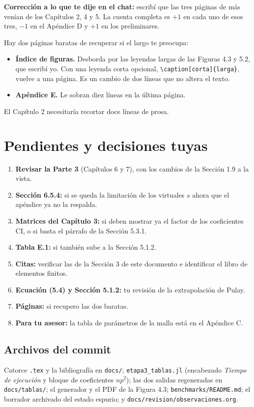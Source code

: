 \documentclass[11pt,a4paper]{article}
\newcommand{\arch}[1]{\texttt{\small #1}}
\begin{document}
\textbf{Corrección a lo que te dije en el chat:} escribí que las tres páginas de más venían de los
Capítulos 2, 4 y 5. La cuenta completa es $+1$ en cada uno de esos tres, $-1$ en el Apéndice D y
$+1$ en los preliminares.

Hay dos páginas baratas de recuperar si el largo te preocupa:
\begin{itemize}
\item \textbf{Índice de figuras.} Desborda por las leyendas largas de las Figuras 4.3 y 5.2, que
escribí yo. Con una leyenda corta opcional, \verb|\caption[corta]{larga}|, vuelve a una página.
Es un cambio de dos líneas que no altera el texto.
\item \textbf{Apéndice E.} Le sobran diez líneas en la última página.
\end{itemize}
El Capítulo 2 necesitaría recortar doce líneas de prosa.

\section{Pendientes y decisiones tuyas}

\begin{enumerate}
\item \textbf{Revisar la Parte 3} (Capítulos 6 y 7), con los cambios de la Sección 1.9 a la vista.
\item \textbf{Sección 6.5.4:} si se queda la limitación de los virtuales $s$ ahora que el
apéndice ya no la respalda.
\item \textbf{Matrices del Capítulo 3:} si deben mostrar ya el factor de los coeficientes CI, o si
basta el párrafo de la Sección 5.3.1.
\item \textbf{Tabla E.1:} si también sube a la Sección 5.1.2.
\item \textbf{Citas:} verificar las de la Sección 3 de este documento e identificar el libro de
elementos finitos.
\item \textbf{Ecuación (5.4) y Sección 5.1.2:} tu revisión de la extrapolación de Pulay.
\item \textbf{Páginas:} si recupero las dos baratas.
\item \textbf{Para tu asesor:} la tabla de parámetros de la malla está en el Apéndice C.
\end{enumerate}

\subsection*{Archivos del commit}

Catorce \arch{.tex} y la bibliografía en \arch{docs/}; \arch{etapa3\_tablas.jl} (encabezado
\emph{Tiempo de ejecución} y bloque de coeficientes $np^2$); las dos salidas regeneradas en
\arch{docs/tablas/}; el generador y el PDF de la Figura 4.3; \arch{benchmarks/README.md}; el
borrador archivado del estado espurio; y \arch{docs/revision/observaciones.org}.
\end{document}
